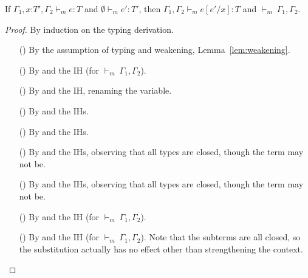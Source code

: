 \documentclass[9pt]{extarticle}
\newcommand{\ottnt}[1]{\mathit{#1}}
\newcommand{\ottsym}[1]{#1}
\begin{document}
\begin{lemma}[Substitution]
  \label{lem:substitution}
  If $  \Gamma_{{\mathrm{1}}} , \mathit{x} \mathord{:} \ottnt{T'}   \ottsym{,}  \Gamma_{{\mathrm{2}}}   \vdash _{ \ottnt{m} }  \ottnt{e}  :  \ottnt{T} $ and $ \emptyset   \vdash _{ \ottnt{m} }  \ottnt{e'}  :  \ottnt{T'} $, then
  $ \Gamma_{{\mathrm{1}}}  \ottsym{,}  \Gamma_{{\mathrm{2}}}   \vdash _{ \ottnt{m} }   \ottnt{e}  [  \ottnt{e'} / \mathit{x}  ]   :  \ottnt{T} $ and $ \mathord{  \vdash _{ \ottnt{m} } }~ \Gamma_{{\mathrm{1}}}  \ottsym{,}  \Gamma_{{\mathrm{2}}} $.
{\iffull
  \begin{proof}
    By induction on the typing derivation.
\begin{itemize}
    \item[(\T{Var})] By the assumption of typing and weakening,
      Lemma~\ref{lem:weakening}.

    \item[(\T{Const})] By  and the IH (for $ \mathord{  \vdash _{ \ottnt{m} } }~ \Gamma_{{\mathrm{1}}}  \ottsym{,}  \Gamma_{{\mathrm{2}}} $).

    \item[(\T{Abs})] By  and the IH, renaming the variable.

    \item[(\T{Op})] By  and the IHs.

    \item[(\T{App})] By  and the IHs.

    \item[(\T{Cast})] By  and the IHs, observing that all
      types are closed, though the term may not be.

    \item[(\T{Coerce})] By  and the IHs, observing that all
      types are closed, though the term may not be.

    \item[(\T{Blame})] By  and the IH (for $ \mathord{  \vdash _{ \ottnt{m} } }~ \Gamma_{{\mathrm{1}}}  \ottsym{,}  \Gamma_{{\mathrm{2}}} $).

    \item[(\T{Check})] By  and the IH (for $ \mathord{  \vdash _{ \ottnt{m} } }~ \Gamma_{{\mathrm{1}}}  \ottsym{,}  \Gamma_{{\mathrm{2}}} $). Note that the subterms are all closed, so the
      substitution actually has no effect other than strengthening the
      context.

    \end{itemize}    
  \end{proof}
  \fi}
\end{lemma}
\end{document}
